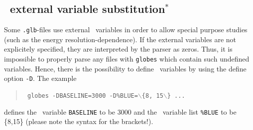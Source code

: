 \subsection*{\AEDL\ external variable substitution$^*$}

Some {\tt .glb}-files use external \AEDL\ variables in order to allow
special purpose studies (such as the energy resolution-dependence). If 
the external variables are not explicitely specified, they are
interpreted by the parser as zeros. Thus, it is impossible to properly
parse any files with {\tt globes} which contain such undefined variables. 
Hence, there is the possibility to define \AEDL\ variables by using the define option {\tt -D}. The example
\begin{quote}
{\tt
globes -DBASELINE=3000 -D\%BLUE=$\backslash$\{8, 15$\backslash$\} ...
}
\end{quote}
defines the \AEDL\ variable {\tt BASELINE} to be $3000$ and the \AEDL\ variable list
{\tt \%BLUE} to be \{8,15\} (please note the syntax for the brackets!).

